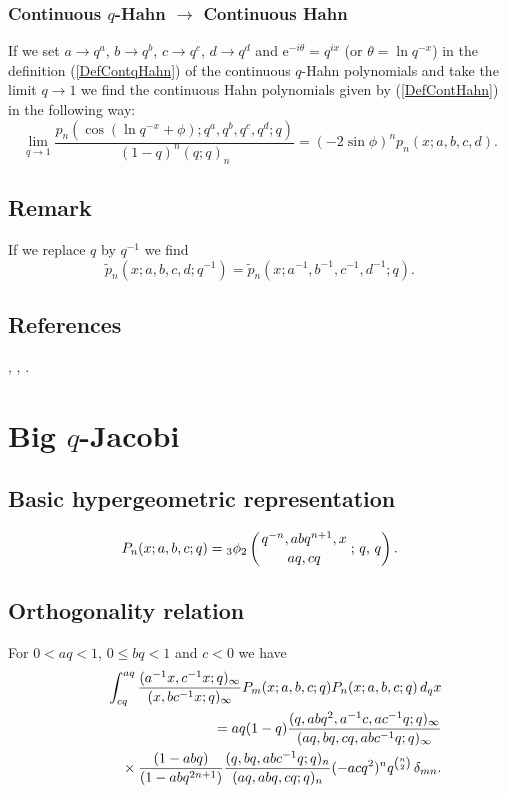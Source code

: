 \documentclass[envcountchap,graybox]{svmono}
\newcommand{\qhyp}[5]{\mbox{}_{#1}{\phi}_{#2}
\left(\genfrac{}{}{0pt}{}{#3}{#4}\,;\,q,\,#5\right)}
\newcommand{\mathindent}{\hspace{7.5mm}}
\newcommand{\e}{\textrm{e}}
\begin{document}
\subsubsection*{Continuous $q$-Hahn $\rightarrow$ Continuous Hahn}
If we set $a\rightarrow q^a$, $b\rightarrow q^b$, $c\rightarrow q^c$, $d\rightarrow q^d$
and $\e^{-i\theta}=q^{ix}$ (or $\theta=\ln q^{-x}$) in the definition (\ref{DefContqHahn})
of the continuous $q$-Hahn polynomials and take the limit $q\rightarrow 1$ we find
the continuous Hahn polynomials given by (\ref{DefContHahn}) in the following way:
\begin{equation}
\lim_{q\rightarrow 1}\frac{p_n(\cos(\ln q^{-x}+\phi);q^a,q^b,q^c,q^d;q)}
{(1-q)^n(q;q)_n}=(-2\sin\phi)^np_n(x;a,b,c,d).
\end{equation}

\newpage

\subsection*{Remark}
If we replace $q$ by $q^{-1}$ we find
$${\tilde p}_n(x;a,b,c,d;q^{-1})={\tilde p}_n(x;a^{-1},b^{-1},c^{-1},d^{-1};q).$$

\subsection*{References}
\cite{AndrewsAskey85}, \cite{AskeyWilson85}, \cite{GasperRahman90}.


\section{Big $q$-Jacobi}
\par\setcounter{equation}{0}

\subsection*{Basic hypergeometric representation}
\begin{equation}
\label{DefBigqJacobi}
P_n(x;a,b,c;q)=\qhyp{3}{2}{q^{-n},abq^{n+1},x}{aq,cq}{q}.
\end{equation}

\subsection*{Orthogonality relation}
For $0<aq<1$, $0\leq bq<1$ and $c<0$ we have
\begin{eqnarray}
\label{OrtBigqJacobi}
& &\int_{cq}^{aq}\frac{(a^{-1}x,c^{-1}x;q)_{\infty}}{(x,bc^{-1}x;q)_{\infty}}
P_m(x;a,b,c;q)P_n(x;a,b,c;q)\,d_qx\nonumber\\
& &{}=aq(1-q)\frac{(q,abq^2,a^{-1}c,ac^{-1}q;q)_{\infty}}{(aq,bq,cq,abc^{-1}q;q)_{\infty}}\nonumber\\
& &{}\mathindent{}\times\frac{(1-abq)}{(1-abq^{2n+1})}
\frac{(q,bq,abc^{-1}q;q)_n}{(aq,abq,cq;q)_n}(-acq^2)^nq^{\binom{n}{2}}\,\delta_{mn}.
\end{eqnarray}
\end{document}
